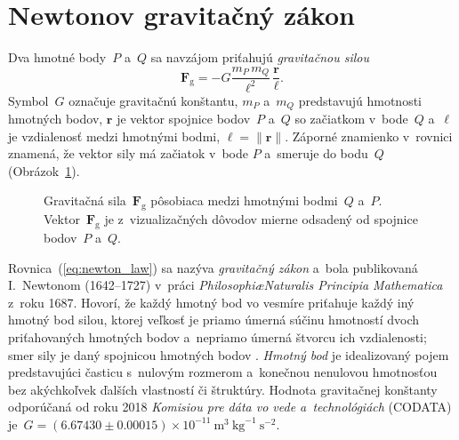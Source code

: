 \documentclass[a4paper, 12pt]{book}
\newcommand{\gidx}{\mathrm g}
\let\vec\mathbf
\begin{document}
\section{Newtonov gravitačný zákon}
\label{sec:newton_law}

Dva hmotné body~$P$ a~$Q$ sa navzájom priťahujú \emph{gravitačnou silou}
%
\begin{equation}
\label{eq:newton_law}
\vec F_\gidx = -G \frac{m_P \, m_Q}{\ell^2} \, \frac{\vec r}{\ell}{.}
\end{equation}
%
Symbol~$G$ označuje gravitačnú konštantu, $m_P$ a~$m_Q$ predstavujú hmotnosti 
hmotných bodov, $\vec r$ je vektor spojnice bodov~$P$ a~$Q$ so začiatkom 
v~bode~$Q$ a~$\ell$ je vzdialenosť medzi hmotnými bodmi, $\ell = \| \vec r \|$.  
Záporné znamienko v~rovnici znamená, že vektor sily má začiatok v~bode $P$ 
a~smeruje do bodu~$Q$ (Obrázok~\ref{fig:newton_law}).

\begin{figure}[b]
\centering

\caption{Gravitačná sila~$\vec F_\gidx$ pôsobiaca medzi hmotnými bodmi~$Q$ 
a~$P$.  Vektor~$\vec F_\gidx$ je z~vizualizačných dôvodov mierne odsadený od 
spojnice bodov~$P$ a~$Q$.}
\label{fig:newton_law}
\end{figure}

Rovnica~(\ref{eq:newton_law}) sa nazýva \emph{gravitačný zákon} a~bola 
publikovaná I.~Newtonom (1642--1727) v~práci \emph{Philosophi\ae Naturalis 
Principia Mathematica} z~roku 1687.  Hovorí, že každý hmotný bod vo vesmíre 
priťahuje každý iný hmotný bod silou, ktorej veľkosť je priamo úmerná súčinu 
hmotností dvoch priťahovaných hmotných bodov a~nepriamo úmerná štvorcu ich 
vzdialenosti; smer sily je daný spojnicou hmotných bodov 
\parencite{Kellogg1967}.  \emph{Hmotný bod} je idealizovaný pojem predstavujúci 
časticu s~nulovým rozmerom a~konečnou nenulovou hmotnosťou bez akýchkoľvek 
ďalších vlastností či štruktúry.  Hodnota gravitačnej konštanty odporúčaná od 
roku 2018 \emph{Komisiou pre dáta vo vede a~technológiách} (CODATA) je~$G 
= (6.67430 \pm 0.00015) \times 10^{-11} \ \mathrm{m}^3 \ \mathrm{kg}^{-1} 
\ \mathrm{s}^{-2}$.
\end{document}
